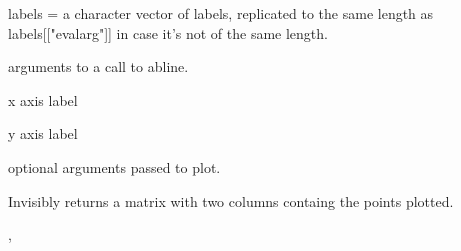 \documentclass{article}
\begin{document}
\begin{Arguments}
\begin{ldescription}
labels = a character vector of labels, replicated to the same length
as labels[["evalarg"]] in case it's not of the same length.  

\item[\code{abline}] arguments to a call to abline.  

\item[\code{xlab}] x axis label 

\item[\code{ylab}] y axis label 

\item[\code{...}] optional arguments passed to plot.  

\end{ldescription}
\end{Arguments}
\begin{Value}
Invisibly returns a matrix with two columns containg the points
plotted.
\end{Value}
\begin{SeeAlso}\relax
{}, 
\end{SeeAlso}
\begin{Examples}
\end{Examples}
\end{document}
